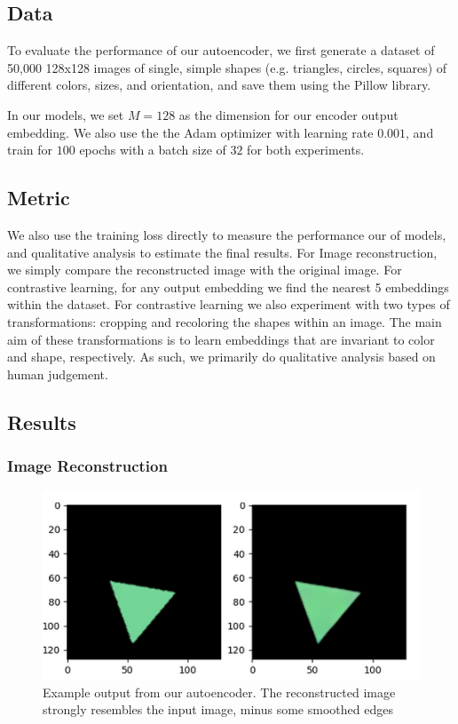 \documentclass{article}
\begin{document}
\subsection{Data}
To evaluate the performance of our autoencoder, we first generate a dataset of 50,000 128x128 images of single, simple shapes (e.g. triangles, circles, squares) of different colors, sizes, and orientation, and save them using the Pillow library. 

In our models, we set $M = 128$ as the dimension for our encoder output embedding. We also use the the Adam optimizer with learning rate $0.001$, and train for $100$ epochs with a batch size of $32$ for both experiments. 

\subsection{Metric} We also use the training loss directly to measure the performance our of models, and qualitative analysis to estimate the final results. For Image reconstruction, we simply compare the reconstructed image with the original image. For contrastive learning, for any output embedding we find the nearest 5 embeddings within the dataset. For contrastive learning we also experiment with two types of transformations: cropping and recoloring the shapes within an image. The main aim of these transformations is to learn embeddings that are invariant to color and shape, respectively. As such, we primarily do qualitative analysis based on human judgement.

\subsection{Results}

\subsubsection{Image Reconstruction}

\begin{figure}
\includegraphics[scale=0.5]{autoencoder_results.png}
\caption{Example output from our autoencoder. The reconstructed image strongly resembles the input image, minus some smoothed edges}\label{fig:autoencoder_res} 
\end{figure}
\end{document}
